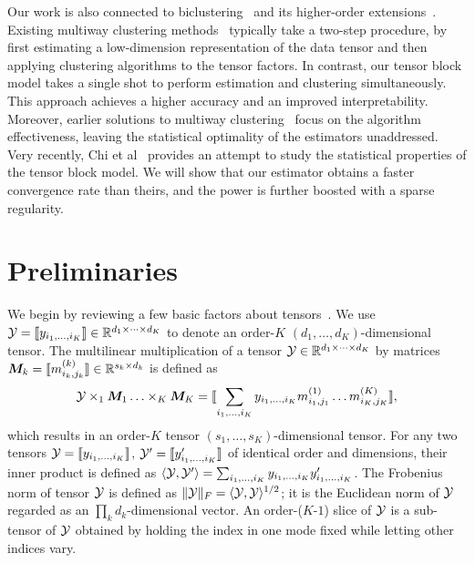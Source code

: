 \documentclass{article}
\begin{document}
Our work is also connected to biclustering~\cite{tan2014sparse} and its higher-order extensions~\cite{kolda2008scalable,wang2015multi}. Existing multiway clustering methods~\cite{kolda2008scalable,wang2015multi,hore2016tensor,wang2018learning} typically take a two-step procedure, by first estimating a low-dimension representation of the data tensor and then applying clustering algorithms to the tensor factors. In contrast, our tensor block model takes a single shot to perform estimation and clustering simultaneously. This approach achieves a higher accuracy and an improved interpretability. Moreover, earlier solutions to multiway clustering~\cite{jegelka2009approximation,kolda2008scalable} focus on the algorithm effectiveness, leaving the statistical optimality of the estimators unaddressed. Very recently, Chi et al~\cite{chi2018provable} provides an attempt to study the statistical properties of the tensor block model. We will show that our estimator obtains a faster convergence rate than theirs, and the power is further boosted with a sparse regularity. 



\section{Preliminaries}

We begin by reviewing a few basic factors about tensors~\cite{kolda2009tensor}. We use $\mathcal{Y}=\llbracket y_{i_1,\ldots,i_K} \rrbracket\in \mathbb{R}^{d_1\times \cdots\times d_K}$ to denote an order-$K$ $(d_1,\ldots,d_K)$-dimensional tensor. The multilinear multiplication of a tensor $\mathcal{Y}\in\mathbb{R}^{d_1\times \cdots\times d_K}$ by matrices $\bm M_k=\llbracket m_{i_k,j_k}^{(k)} \rrbracket\in\mathbb{R}^{s_k\times d_k}$ is defined as
\[
\mathcal{Y} \times_1\bm M_1\ldots \times_K \bm M_K=\llbracket \sum_{i_1,\ldots,i_K}y_{i_1,\ldots,i_K}m_{i_1,j_1}^{(1)}\ldots m_{i_K,j_K}^{(K)} \rrbracket,
\]
which results in an order-$K$ tensor $(s_1,\ldots,s_K)$-dimensional tensor. For any two tensors $\mathcal{Y}=\llbracket y_{i_1,\ldots,i_K} \rrbracket$, $\mathcal{Y}'=\llbracket y'_{i_1,\ldots,i_K} \rrbracket$ of identical order and dimensions, their inner product is defined as $\langle \mathcal{Y}, \mathcal{Y}'\rangle =\sum_{i_1,\ldots,i_K}y_{i_1,\ldots,i_K}y'_{i_1,\ldots,i_K}$. The Frobenius norm of tensor $\mathcal{Y}$ is defined as $\lVert\mathcal{Y}\rVert_F=\langle \mathcal{Y}, \mathcal{Y} \rangle^{1/2}$; it is the Euclidean norm of $\mathcal{Y}$ regarded as an $\prod_k d_k$-dimensional vector. An order-($K$-$1$) slice of $\mathcal{Y}$ is a sub-tensor of $\mathcal{Y}$ obtained by holding the index in one mode fixed while letting other indices vary. 
\end{document}
